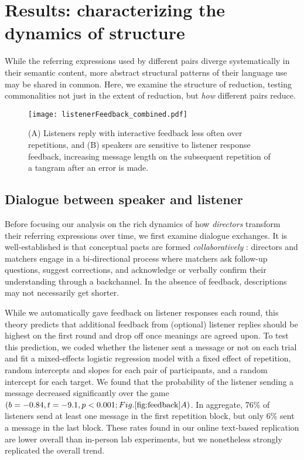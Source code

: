 \section{Results: characterizing the dynamics of structure}\label{results}

While the referring expressions used by different pairs diverge systematically in their semantic content, more abstract structural patterns of their language use may be shared in common.
Here, we examine the structure of reduction, testing commonalities not just in the extent of reduction, but \emph{how} different pairs reduce.

\begin{figure}[t]
\centering
\texttt{[image: listenerFeedback\_combined.pdf]}
\caption{(A) Listeners reply with interactive feedback less often over repetitions, and (B) speakers are sensitive to listener response feedback, increasing message length on the subsequent repetition of a tangram after an error is made.}
\label{fig:feedback}
\end{figure}

\subsection{Dialogue between speaker and listener}\label{listener-feedback}

Before focusing our analysis on the rich dynamics of how \emph{directors} transform their referring expressions over time, we first examine dialogue exchanges.
It is well-established is that conceptual pacts are formed \emph{collaboratively} \cite[see also \cite{KraussWeinheimer66_Tangrams, GarrodFayLeeOberlanderMacLeod07_GraphicalSymbolSystems}]{ClarkWilkesGibbs86_ReferringCollaborative}: 
directors and matchers engage in a bi-directional process where matchers ask follow-up questions, suggest corrections, and acknowledge or verbally confirm their understanding through a backchannel. 
In the absence of feedback, descriptions may not necessarily get shorter.

While we automatically gave feedback on listener responses each round, this theory predicts that additional feedback from (optional) listener  replies should be highest on the first round and drop off once meanings are agreed upon. 
To test this prediction, we coded whether the listener sent a message or not on each trial and fit a mixed-effects logistic regression model with a fixed effect of repetition, random intercepts and slopes for each pair of participants, and a random intercept for each target. 
We found that the probability of the listener sending a message decreased significantly over the game $(b=-0.84, t = -9.1, p < 0.001; Fig. \ref{fig:feedback}A)$.
In aggregate, 76\% of listeners send at least one message in the first repetition block, but only 6\% sent a message in the last block.
These rates found in our online text-based replication are lower overall than in-person lab experiments, but we nonetheless strongly replicated the overall trend.

